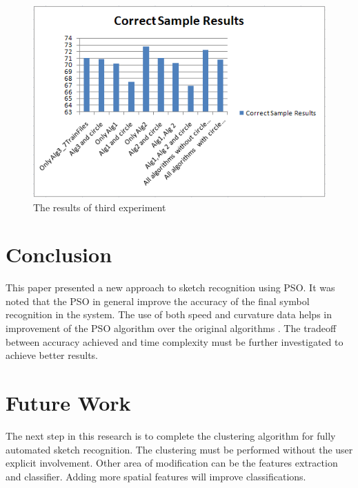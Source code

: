 \documentclass[a4paper,10pt]{IEEEconf}
\begin{document}
\begin{figure}[]
	\centering
		\includegraphics[scale=0.4]{images/test1.png}
	\caption{The results of third experiment}
	\label{fig:test3}
\end{figure}
\section{Conclusion}
This paper presented a new approach to sketch recognition using PSO. It was noted that the PSO in general improve the accuracy of the final symbol recognition in the system. The use of both speed and curvature data helps in improvement of the PSO algorithm over the original algorithms \cite{CruveDivisionSwarm,PolygonApproximationPSO}. The tradeoff between accuracy achieved and time complexity must be further investigated to achieve better results.  
\section{Future Work}
The next step in this research is to complete the clustering algorithm for fully automated sketch recognition. The clustering must be performed without the user explicit involvement. Other area of modification can be the features extraction and classifier. Adding more spatial features will improve classifications.  %
%

\end{document}
